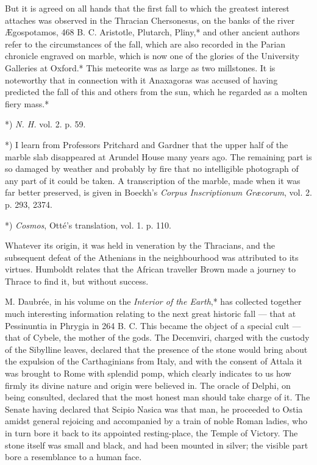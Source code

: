 \documentclass[a4paper, 12pt, oneside, polutonikogreek, english]{article}
\begin{document}
But it is agreed on all hands that the first fall to which the greatest interest attaches was observed in the Thracian Chersonesus, on the banks of the river Ægospotamos, 468 B. C. Aristotle, Plutarch, Pliny,* and other ancient authors refer to the circumstances of the fall, which are also recorded in the Parian chronicle engraved on marble, which is now one of the glories of the University Galleries at Oxford.* This meteorite was as large as two millstones. It is noteworthy that in connection with it Anaxagoras was accused of having predicted the fall of this and others from the sun, which he regarded as a molten fiery mass.*

*) \emph{N. H.} vol. 2. p. 59.

*) I learn from Professors Pritchard and Gardner that the upper half of the marble slab disappeared at Arundel House many years ago. The remaining part is so damaged by weather and probably by fire that no intelligible photograph of any part of it could be taken. A transcription of the marble, made when it was far better preserved, is given in Boeckh's \emph{Corpus Inscriptionum Græcorum}, vol. 2. p. 293, 2374.

*) \emph{Cosmos}, Otté's translation, vol. 1. p. 110.

Whatever its origin, it was held in veneration by the Thracians, and the subsequent defeat of the Athenians in the neighbourhood was attributed to its virtues. Humboldt relates that the African traveller Brown made a journey to Thrace to find it, but without success.

M. Daubrée, in his volume on the \emph{Interior of the Earth},* has collected together much interesting information relating to the next great historic fall --- that at Pessinuntia in Phrygia in 264 B. C. This became the object of a special cult --- that of Cybele, the mother of the gods. The Decemviri, charged with the custody of the Sibylline leaves, declared that the presence of the stone would bring about the expulsion of the Carthaginians from Italy, and with the consent of Attala it was brought to Rome with splendid pomp, which clearly indicates to us how firmly its divine nature and origin were believed in. The oracle of Delphi, on being consulted, declared that the most honest man should take charge of it. The Senate having declared that Scipio Nasica was that man, he proceeded to Ostia amidst general rejoicing and accompanied by a train of noble Roman ladies, who in turn bore it back to its appointed resting-place, the Temple of Victory. The stone itself was small and black, and had been mounted in silver; the visible part bore a resemblance to a human face.
\end{document}
